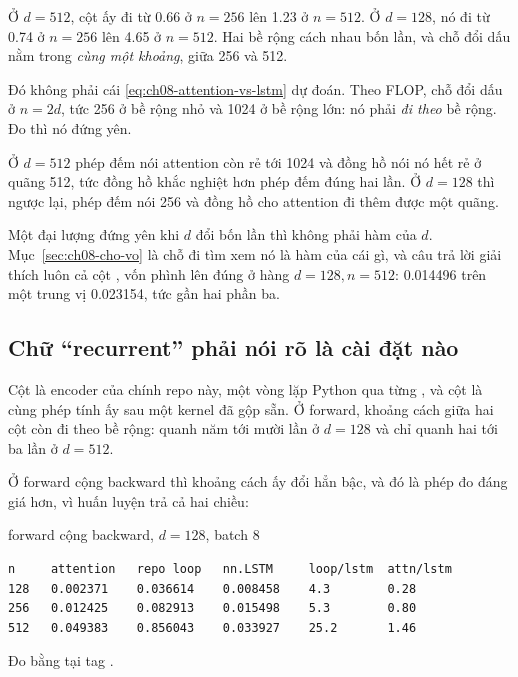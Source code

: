 Ở \(d = 512\), cột ấy đi từ 0.66 ở \(n = 256\) lên 1.23 ở \(n = 512\). Ở
\(d = 128\), nó đi từ 0.74 ở \(n = 256\) lên 4.65 ở \(n = 512\). Hai bề rộng
cách nhau bốn lần, và chỗ đổi dấu nằm trong \emph{cùng một khoảng},
giữa 256 và 512.

Đó không phải cái \eqref{eq:ch08-attention-vs-lstm} dự đoán. Theo FLOP, chỗ đổi
dấu ở \(n = 2d\), tức 256 ở bề rộng nhỏ và 1024 ở bề rộng lớn: nó phải \emph{đi
theo} bề rộng. Đo thì nó đứng yên.

Ở \(d = 512\) phép đếm nói attention còn rẻ tới 1024 và đồng hồ nói nó hết rẻ ở
quãng 512, tức đồng hồ khắc nghiệt hơn phép đếm đúng hai lần. Ở \(d = 128\) thì
ngược lại, phép đếm nói 256 và đồng hồ cho attention đi thêm được một quãng.

Một đại lượng đứng yên khi \(d\) đổi bốn lần thì không phải hàm của \(d\).
Mục~\ref{sec:ch08-cho-vo} là chỗ đi tìm xem nó là hàm của cái gì, và câu trả lời
giải thích luôn cả cột , vốn phình lên đúng ở hàng
\(d = 128, n = 512\): 0.014496 trên một trung vị 0.023154, tức gần hai phần ba.

\subsection*{Chữ \enquote{recurrent} phải nói rõ là cài đặt nào}

%
Cột  là encoder của chính repo này, một vòng lặp Python qua từng
, và cột  là cùng phép tính ấy sau
một kernel đã gộp
sẵn. Ở forward, khoảng cách giữa hai cột còn đi theo bề rộng: quanh năm tới mười
lần ở \(d = 128\) và chỉ quanh hai tới ba lần ở \(d = 512\).

Ở forward cộng backward thì khoảng cách ấy đổi hẳn bậc, và đó là phép đo đáng
giá hơn, vì huấn luyện trả cả hai chiều:

\begin{measured}{forward cộng backward, \(d = 128\), batch 8}
\begin{verbatim}
n     attention   repo loop   nn.LSTM     loop/lstm  attn/lstm
128   0.002371    0.036614    0.008458    4.3        0.28
256   0.012425    0.082913    0.015498    5.3        0.80
512   0.049383    0.856043    0.033927    25.2       1.46
\end{verbatim}

Đo bằng  tại tag .
\end{measured}

